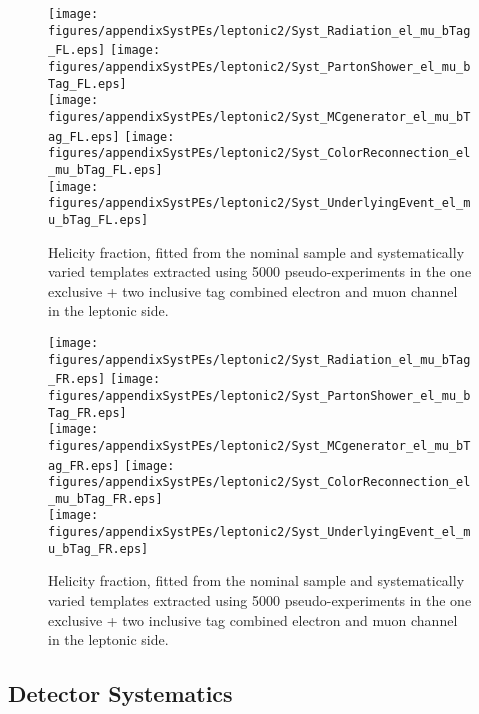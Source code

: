 \begin{figure}[!hb]
\begin{center}
        \texttt{[image: figures/appendixSystPEs/leptonic2/Syst\_Radiation\_el\_mu\_bTag\_FL.eps]}
        \texttt{[image: figures/appendixSystPEs/leptonic2/Syst\_PartonShower\_el\_mu\_bTag\_FL.eps]}\\
        \texttt{[image: figures/appendixSystPEs/leptonic2/Syst\_MCgenerator\_el\_mu\_bTag\_FL.eps]}
        \texttt{[image: figures/appendixSystPEs/leptonic2/Syst\_ColorReconnection\_el\_mu\_bTag\_FL.eps]}\\
        \texttt{[image: figures/appendixSystPEs/leptonic2/Syst\_UnderlyingEvent\_el\_mu\_bTag\_FL.eps]}
        
\caption{Helicity fraction, \fl fitted from the nominal \ttbar sample and systematically varied templates extracted using 5000 pseudo-experiments in the one exclusive + two inclusive \bt tag combined electron and muon channel in the leptonic side. }
\label{fig:systematicVar_lep_fl_elmu2incl_1}
\end{center}
\end{figure}

\begin{figure}[!hb]
\begin{center}
        \texttt{[image: figures/appendixSystPEs/leptonic2/Syst\_Radiation\_el\_mu\_bTag\_FR.eps]}
        \texttt{[image: figures/appendixSystPEs/leptonic2/Syst\_PartonShower\_el\_mu\_bTag\_FR.eps]}\\
        \texttt{[image: figures/appendixSystPEs/leptonic2/Syst\_MCgenerator\_el\_mu\_bTag\_FR.eps]}
        \texttt{[image: figures/appendixSystPEs/leptonic2/Syst\_ColorReconnection\_el\_mu\_bTag\_FR.eps]}\\
        \texttt{[image: figures/appendixSystPEs/leptonic2/Syst\_UnderlyingEvent\_el\_mu\_bTag\_FR.eps]}
        
\caption{Helicity fraction, \fr fitted from the nominal \ttbar sample and systematically varied templates extracted using 5000 pseudo-experiments in the one exclusive + two inclusive \bt tag combined electron and muon channel in the leptonic side. }
\label{fig:systematicVar_lep_fR_elmu2incl_1}
\end{center}
\end{figure}

\subsection{Detector Systematics}
